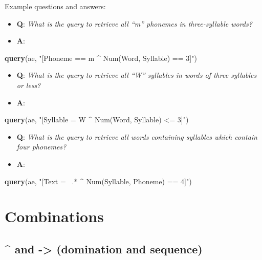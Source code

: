 \documentclass[]{book}
\newenvironment{Shaded}{\begin{snugshade}}{\end{snugshade}}
\newcommand{\KeywordTok}[1]{\textcolor[rgb]{0.13,0.29,0.53}{\textbf{#1}}}
\newcommand{\NormalTok}[1]{#1}
\newcommand{\StringTok}[1]{\textcolor[rgb]{0.31,0.60,0.02}{#1}}
\providecommand{\tightlist}{%
  \setlength{\itemsep}{0pt}\setlength{\parskip}{0pt}}
\begin{document}
Example questions and answers:

\begin{itemize}
\tightlist
\item
  \textbf{Q}: \emph{What is the query to retrieve all ``m'' phonemes in three-syllable words?}
\item
  \textbf{A}:
\end{itemize}

\begin{Shaded}
\begin{Highlighting}[]
\KeywordTok{query}\NormalTok{(ae, }\StringTok{"[Phoneme == m ^ Num(Word, Syllable) == 3]"}\NormalTok{)}
\end{Highlighting}
\end{Shaded}

\begin{itemize}
\tightlist
\item
  \textbf{Q}: \emph{What is the query to retrieve all ``W'' syllables in words of three syllables or less?}
\item
  \textbf{A}:
\end{itemize}

\begin{Shaded}
\begin{Highlighting}[]
\KeywordTok{query}\NormalTok{(ae, }\StringTok{"[Syllable = W ^ Num(Word, Syllable) <= 3]"}\NormalTok{)}
\end{Highlighting}
\end{Shaded}

\begin{itemize}
\tightlist
\item
  \textbf{Q}: \emph{What is the query to retrieve all words containing syllables which contain four phonemes?}
\item
  \textbf{A}:
\end{itemize}

\begin{Shaded}
\begin{Highlighting}[]
\KeywordTok{query}\NormalTok{(ae, }\StringTok{"[Text =~ .* ^ Num(Syllable, Phoneme) == 4]"}\NormalTok{)}
\end{Highlighting}
\end{Shaded}

\hypertarget{combinations}{%
\section{Combinations}\label{combinations}}

\hypertarget{and---domination-and-sequence}{%
\subsection{\^{} and -\textgreater{} (domination and sequence)}\label{and---domination-and-sequence}}
\end{document}
